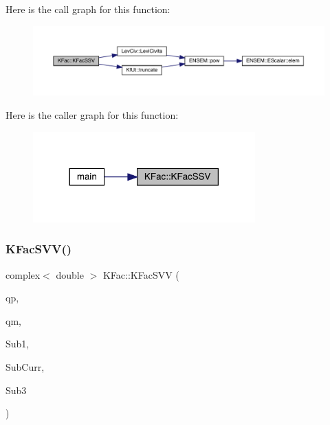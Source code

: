 Here is the call graph for this function\+:
\nopagebreak
\begin{figure}[H]
\begin{center}
\leavevmode
\includegraphics[width=350pt]{d2/d89/namespaceKFac_a3fc08fc4d40cb022d9e68ea0e9e39044_cgraph}
\end{center}
\end{figure}
Here is the caller graph for this function\+:
\nopagebreak
\begin{figure}[H]
\begin{center}
\leavevmode
\includegraphics[width=242pt]{d2/d89/namespaceKFac_a3fc08fc4d40cb022d9e68ea0e9e39044_icgraph}
\end{center}
\end{figure}
\mbox{\label{namespaceKFac_a9c2aaf9fd1ca6172ffc09b8cf0c30d0e}} 
\subsubsection{\texorpdfstring{KFacSVV()}{KFacSVV()}}
{\footnotesize\ttfamily complex$<$ double $>$ K\+Fac\+::\+K\+Fac\+S\+VV (\begin{DoxyParamCaption}\item[{Eigen\+::\+Vector\+Xd \&}]{qp,  }\item[{Eigen\+::\+Vector\+Xd \&}]{qm,  }\item[{Eigen\+::\+Matrix\+Xcd \&}]{Sub1,  }\item[{Eigen\+::\+Matrix\+Xcd \&}]{Sub\+Curr,  }\item[{Eigen\+::\+Matrix\+Xcd \&}]{Sub3 }\end{DoxyParamCaption})}

